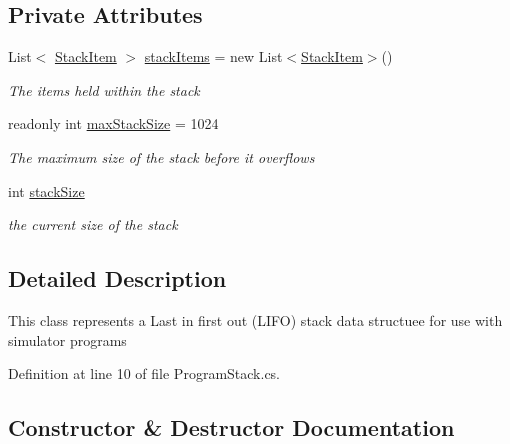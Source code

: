 \subsection*{Private Attributes}
\begin{DoxyCompactItemize}
\item 
List$<$ \hyperlink{class_c_p_u___o_s___simulator_1_1_c_p_u_1_1_stack_item}{Stack\+Item} $>$ \hyperlink{class_c_p_u___o_s___simulator_1_1_c_p_u_1_1_program_stack_ada087487ee69e4e38e2f2591bdc28f37}{stack\+Items} = new List$<$\hyperlink{class_c_p_u___o_s___simulator_1_1_c_p_u_1_1_stack_item}{Stack\+Item}$>$()
\begin{DoxyCompactList}\small\item\em The items held within the stack \end{DoxyCompactList}\item 
readonly int \hyperlink{class_c_p_u___o_s___simulator_1_1_c_p_u_1_1_program_stack_a2e475bb3c8ce48b8b0a86e31b2cb972e}{max\+Stack\+Size} = 1024
\begin{DoxyCompactList}\small\item\em The maximum size of the stack before it overflows \end{DoxyCompactList}\item 
int \hyperlink{class_c_p_u___o_s___simulator_1_1_c_p_u_1_1_program_stack_ab0667a30e4d6e10c3ffddfdfbc084102}{stack\+Size}
\begin{DoxyCompactList}\small\item\em the current size of the stack \end{DoxyCompactList}\end{DoxyCompactItemize}


\subsection{Detailed Description}
This class represents a Last in first out (L\+I\+F\+O) stack data structuee for use with simulator programs 



Definition at line 10 of file Program\+Stack.\+cs.



\subsection{Constructor \& Destructor Documentation}
\hypertarget{class_c_p_u___o_s___simulator_1_1_c_p_u_1_1_program_stack_a2a30dfbb7df3408de94c883c44aff090}{}
